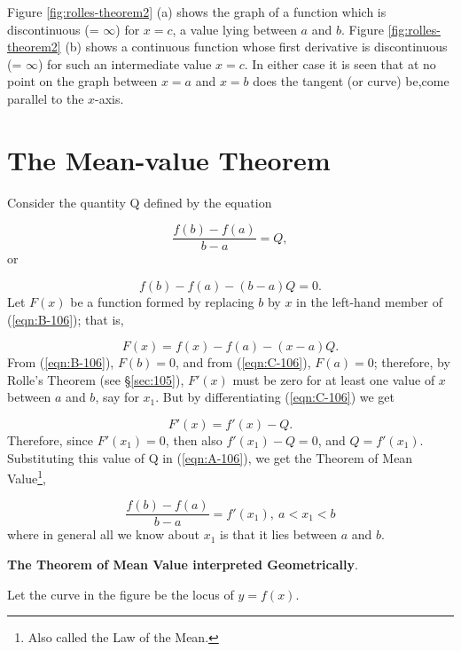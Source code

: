 Figure \ref{fig:rolles-theorem2} (a) shows the graph of 
a function which is discontinuous (= $\infty$) for $x = c$, 
a value lying between $a$ and $b$. 
Figure \ref{fig:rolles-theorem2} (b) shows a continuous 
function whose first derivative is discontinuous (= $\infty$) 
for such an intermediate value $x = c$. In either case 
it is seen that at no point on the graph between $x = a$ 
and $x = b$ does the tangent (or curve) be,come parallel to 
the $x$-axis.

\section{The Mean-value Theorem}
\label{sec:106}

Consider the quantity Q defined by the 
equation

\begin{equation}
\frac{f(b) - f(a)}{b - a} = Q, 
\label{eqn:A-106}
\end{equation}
or

\begin{equation}
f(b) - f(a) - (b - a)Q = 0.
\label{eqn:B-106}
\end{equation}
Let $F(x)$ be a function formed by replacing $b$ by $x$ 
in the left-hand member of (\ref{eqn:B-106}); that is,

\begin{equation}
F(x) = f(x) - f(a) - (x - a)Q.
\label{eqn:C-106}
\end{equation}
From (\ref{eqn:B-106}), 	
$F(b) = 0$, and from (\ref{eqn:C-106}), $F(a) = 0$;
therefore, by Rolle's Theorem (see \S \ref{sec:105}), %
$F'(x)$ must be zero for at least one value of $x$ between 
$a$ and $b$, say for $x_1$. But by differentiating (\ref{eqn:C-106}) we get
 
\[
 	F'(x) = f'(x) - Q.
\]
Therefore, since $F'(x_1) = 0$, then also 
$f'(x_1) - Q = 0$, and 	$Q = f'(x_1)$.
Substituting this value of Q in (\ref{eqn:A-106}), we get the 
Theorem of Mean Value\footnote{Also called the Law of the Mean.},

\begin{equation}
\frac{f(b) - f(a)}{b - a} = f'(x_1),\ a < x_1 < b
\label{eqn:44-106}
\end{equation}
where in general all we know about $x_1$ is that it lies 
between $a$ and $b$.

\noindent
{\bf The Theorem of Mean Value interpreted Geometrically}. 

Let the curve in the figure be the locus of $y = f(x)$.



